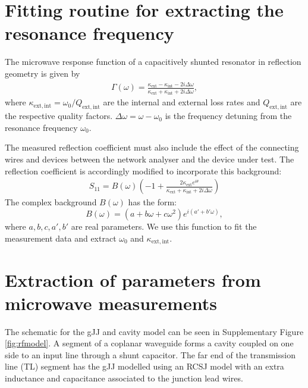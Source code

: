 \documentclass[preprint,
  onecolumn,
  notitlepage,
  amsmath,amssymb,
  aip,
  apl,
]{revtex4-1}
\begin{document}
\clearpage

\section{Fitting routine for extracting the resonance frequency}\label{sec:fitting}
\noindent The microwave response function of a capacitively shunted resonator in reflection geometry is given by \cite{pozar_microwave_2012}
\begin{eqnarray}
\Gamma(\omega) = \frac{\kappa_\mathrm{ext}-\kappa_\mathrm{int}-2i\Delta\omega}{\kappa_\mathrm{ext}+\kappa_\mathrm{int}+2i\Delta\omega},
\end{eqnarray}
where $\kappa_\mathrm{ext,int}=\omega_0/Q_\mathrm{ext,int}$ are the internal and external loss rates and $Q_\mathrm{ext,int}$ are the respective quality factors.
$\Delta\omega=\omega-\omega_0$ is the frequency detuning from the resonance frequency $\omega_0$.

The measured reflection coefficient must also include the effect of the connecting wires and devices between the network analyser and the device under test.
The reflection coefficient is accordingly modified to incorporate this background:
\begin{eqnarray}
S_{11} = B(\omega)\left(-1 + \frac{2\kappa_\mathrm{ext}e^{i\theta}}{\kappa_\mathrm{ext}+\kappa_\mathrm{int}+2i\Delta\omega}\right)
\end{eqnarray}
The complex background $B(\omega)$ has the form:
\begin{equation}
B(\omega) = (a+b\omega+c\omega^2)e^{i(a'+b'\omega)},
\end{equation}
where $a,b,c,a',b'$ are real parameters.  We use this function to fit the measurement data and extract $\omega_0$ and $\kappa_\mathrm{ext,int}$.

\section{Extraction of parameters from microwave measurements}\label{sec:extraction}
\noindent The schematic for the gJJ and cavity model can be seen in Supplementary Figure \ref{fig:rfmodel}.
A segment of a coplanar waveguide forms a cavity coupled on one side to an input line through a shunt capacitor.
The far end of the transmission line (TL) segment has the gJJ modelled using an RCSJ model with an extra inductance and capacitance associated to the junction lead wires.
\end{document}

